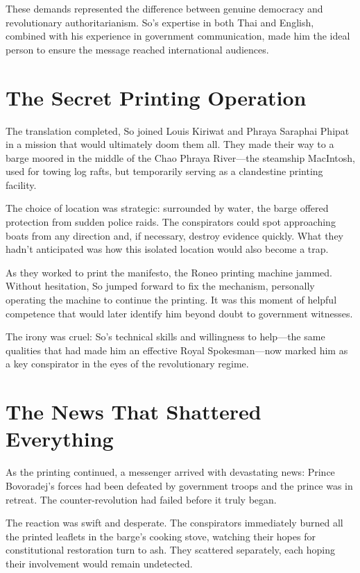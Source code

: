 \documentclass[
  Letterpaper,
]{scrbook}
\begin{document}
These demands represented the difference between genuine democracy and
revolutionary authoritarianism. So's expertise in both Thai and English,
combined with his experience in government communication, made him the
ideal person to ensure the message reached international audiences.

\section{The Secret Printing
Operation}\label{the-secret-printing-operation}

The translation completed, So joined Louis Kiriwat and Phraya Saraphai
Phipat in a mission that would ultimately doom them all. They made their
way to a barge moored in the middle of the Chao Phraya River---the
steamship MacIntosh, used for towing log rafts, but temporarily serving
as a clandestine printing facility.

The choice of location was strategic: surrounded by water, the barge
offered protection from sudden police raids. The conspirators could spot
approaching boats from any direction and, if necessary, destroy evidence
quickly. What they hadn't anticipated was how this isolated location
would also become a trap.

As they worked to print the manifesto, the Roneo printing machine
jammed. Without hesitation, So jumped forward to fix the mechanism,
personally operating the machine to continue the printing. It was this
moment of helpful competence that would later identify him beyond doubt
to government witnesses.

The irony was cruel: So's technical skills and willingness to help---the
same qualities that had made him an effective Royal Spokesman---now
marked him as a key conspirator in the eyes of the revolutionary regime.

\section{The News That Shattered
Everything}\label{the-news-that-shattered-everything}

As the printing continued, a messenger arrived with devastating news:
Prince Bovoradej's forces had been defeated by government troops and the
prince was in retreat. The counter-revolution had failed before it truly
began.

The reaction was swift and desperate. The conspirators immediately
burned all the printed leaflets in the barge's cooking stove, watching
their hopes for constitutional restoration turn to ash. They scattered
separately, each hoping their involvement would remain undetected.
\end{document}
